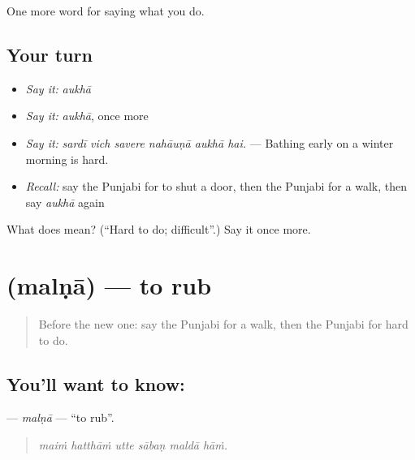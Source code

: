 \begin{grammarlens}[title={What you've built}]
One more word for saying what you do.
\end{grammarlens}

\subsection*{Your turn}
\begin{itemize}
\raggedright
  \item \emph{Say it:} \emph{aukhā}
  \item \emph{Say it:} \emph{aukhā}, once more
  \item \emph{Say it:} \emph{sardī vich savere nahāuṇā aukhā hai.} — Bathing early on a winter morning is hard.
  \item \emph{Recall:} say the Punjabi for to shut a door, then the Punjabi for a walk, then say \emph{aukhā} again
\end{itemize}

\begin{tcolorbox}[breakable,colback=teal!4,colframe=teal!35!black,title={Before you move on}]
What does  mean? (\textquotedblleft{}Hard to do; difficult\textquotedblright{}.) Say it once more.
\end{tcolorbox}
\section[\texorpdfstring{\pa{ਮਲਣਾ} (malṇā)}{ਮਲਣਾ (malṇā)}]{ (malṇā) — to rub}

\label{lesson:PA-C227-malna}



\begin{quote}
Before the new one: say the Punjabi for a walk, then the Punjabi for hard to do.
\end{quote}

\subsection*{You'll want to know: }
\textbf{} — \emph{malṇā} — \textquotedblleft{}to rub\textquotedblright{}.

\begin{quote}
     
\end{quote}

\begin{quote}
\emph{maiṁ hatthāṁ utte sābaṇ maldā hāṁ.}
\end{quote}


